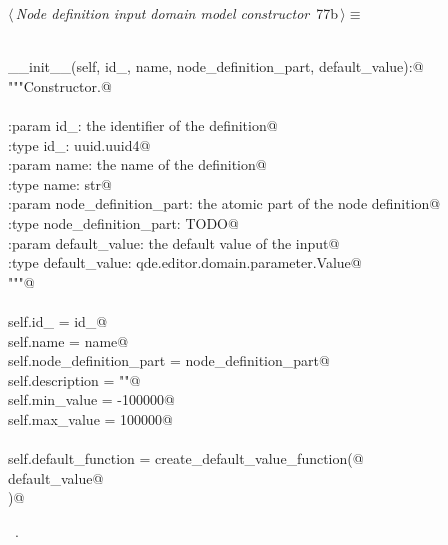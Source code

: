 \documentclass[
    a4paper,      %
    10pt,         %
    openright,    %
    notitlepage,  %
    parskip=half, %
]{scrreprt}       %
\theoremstyle{definition}                    %
\begin{document}
\begin{flushleft} \small
\begin{minipage}{\linewidth}\label{scrap125}\raggedright\small
{} $\langle\,${\itshape Node definition input domain model constructor}\nobreak\ {\footnotesize {77b}}$\,\rangle\equiv$
\vspace{-1exm}
\begin{list}{}{} \item
\mbox{}\lstinline@@\\
\mbox{}\lstinline@def __init__(self, id_, name, node_definition_part, default_value):@\\
\mbox{}\lstinline@    """Constructor.@\\
\mbox{}\lstinline@@\\
\mbox{}\lstinline@    :param id_: the identifier of the definition@\\
\mbox{}\lstinline@    :type  id_: uuid.uuid4@\\
\mbox{}\lstinline@    :param name: the name of the definition@\\
\mbox{}\lstinline@    :type  name: str@\\
\mbox{}\lstinline@    :param node_definition_part: the atomic part of the node definition@\\
\mbox{}\lstinline@    :type node_definition_part: TODO@\\
\mbox{}\lstinline@    :param default_value: the default value of the input@\\
\mbox{}\lstinline@    :type default_value: qde.editor.domain.parameter.Value@\\
\mbox{}\lstinline@    """@\\
\mbox{}\lstinline@@\\
\mbox{}\lstinline@    self.id_                  = id_@\\
\mbox{}\lstinline@    self.name                 = name@\\
\mbox{}\lstinline@    self.node_definition_part = node_definition_part@\\
\mbox{}\lstinline@    self.description          = ""@\\
\mbox{}\lstinline@    self.min_value            = -100000@\\
\mbox{}\lstinline@    self.max_value            = 100000@\\
\mbox{}\lstinline@@\\
\mbox{}\lstinline@    self.default_function = create_default_value_function(@\\
\mbox{}\lstinline@        default_value@\\
\mbox{}\lstinline@    )@{\NWsep}
\end{list}
\vspace{-1.5ex}
\footnotesize
\begin{list}{}{\setlength{\itemsep}{-\parsep}\setlength{\itemindent}{-\leftmargin}}
\item \NWtxtMacroRefIn\ .

\item{}
\end{list}
\end{minipage}\vspace{4ex}
\end{flushleft}
\end{document}
